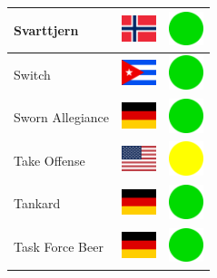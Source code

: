 \documentclass[12pt, a4paper, twoside]{report}
\begin{document}
\begin{center}
\begin{longtable}{|p{5cm}|p{2cm}|p{2cm}|}
 Svarttjern                                                 & \includegraphics[width=1cm]{../img/flags/no} &   \includegraphics[width=1cm]{../likes/y} \\ \hline
 Switch                                                     & \includegraphics[width=1cm]{../img/flags/cu} &   \includegraphics[width=1cm]{../likes/y} \\ \hline
 Sworn Allegiance                                           & \includegraphics[width=1cm]{../img/flags/de} &   \includegraphics[width=1cm]{../likes/y} \\ \hline
 Take Offense                                               & \includegraphics[width=1cm]{../img/flags/us} &   \includegraphics[width=1cm]{../likes/m} \\ \hline
 Tankard                                                    & \includegraphics[width=1cm]{../img/flags/de} &   \includegraphics[width=1cm]{../likes/y} \\ \hline
 Task Force Beer                                            & \includegraphics[width=1cm]{../img/flags/de} &   \includegraphics[width=1cm]{../likes/y} \\ \hline

\end{longtable}
\end{center}
\end{document}
